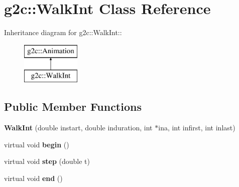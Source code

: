 \hypertarget{classg2c_1_1_walk_int}{
\section{g2c::WalkInt Class Reference}
\label{classg2c_1_1_walk_int}
}
Inheritance diagram for g2c::WalkInt::\begin{figure}[H]
\begin{center}
\leavevmode
\includegraphics[height=2cm]{classg2c_1_1_walk_int}
\end{center}
\end{figure}
\subsection*{Public Member Functions}
\begin{DoxyCompactItemize}
\item 
\hypertarget{classg2c_1_1_walk_int_a094ba0dcf6f6e0fbe849f59f64379cbb}{
{\bfseries WalkInt} (double instart, double induration, int $\ast$ina, int infirst, int inlast)}
\label{classg2c_1_1_walk_int_a094ba0dcf6f6e0fbe849f59f64379cbb}

\item 
\hypertarget{classg2c_1_1_walk_int_a56d4d9d4d0234992cfc408b07902798f}{
virtual void {\bfseries begin} ()}
\label{classg2c_1_1_walk_int_a56d4d9d4d0234992cfc408b07902798f}

\item 
\hypertarget{classg2c_1_1_walk_int_ac0a60bb999ab2ceac8f335de46d28277}{
virtual void {\bfseries step} (double t)}
\label{classg2c_1_1_walk_int_ac0a60bb999ab2ceac8f335de46d28277}

\item 
\hypertarget{classg2c_1_1_walk_int_afedba0ea401f0889a63df7118f1485ce}{
virtual void {\bfseries end} ()}
\label{classg2c_1_1_walk_int_afedba0ea401f0889a63df7118f1485ce}

\end{DoxyCompactItemize}
